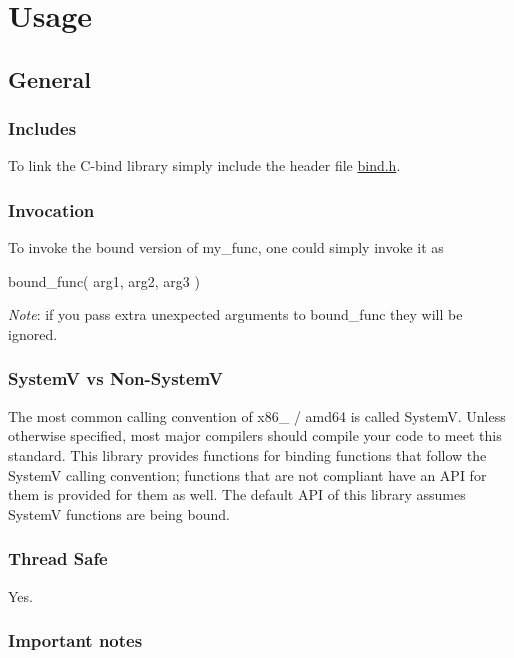 \section*{Usage}

\subsection*{General}

\subsubsection*{Includes}

To link the {\ttfamily C-\/bind} library simply include the header file {\ttfamily \hyperlink{bind_8h}{bind.\+h}}.

\subsubsection*{Invocation}

To invoke the bound version of {\ttfamily my\+\_\+func}, one could simply invoke it as 
\begin{DoxyCode}
bound\_func( arg1, arg2, arg3 )
\end{DoxyCode}
 {\itshape Note}\+: if you pass extra unexpected arguments to {\ttfamily bound\+\_\+func} they will be ignored.

\subsubsection*{SystemV vs Non-\/\+SystemV}

The most common calling convention of {\ttfamily x86\+\_} / {\ttfamily amd64} is called SystemV. Unless otherwise specified, most major compilers should compile your code to meet this standard. This library provides functions for binding functions that follow the SystemV calling convention; functions that are not compliant have an A\+PI for them is provided for them as well. The default A\+PI of this library assumes SystemV functions are being bound.

\subsubsection*{Thread Safe}

Yes.

\subsubsection*{Important notes}


